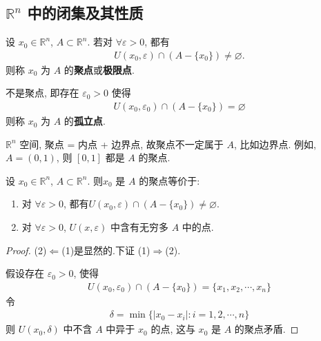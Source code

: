 \documentclass[../../main.tex]{subfiles}
\begin{document}
\subsection{$\mathbb{R}^n$ 中的闭集及其性质}

\begin{definition}[聚点、极限点和孤立点]
设 $x_0 \in \mathbb{R}^n$, $A \subset \mathbb{R}^n$. 若对 $\forall \varepsilon > 0$, 都有
\begin{align*}
U(x_0, \varepsilon) \cap (A - \{x_0\}) \neq \varnothing.
\end{align*}
则称 $x_0$ 为 $A$ 的\textbf{聚点}或\textbf{极限点}. 

不是聚点, 即存在 $\varepsilon_0 > 0$ 使得
\begin{align*}
U(x_0, \varepsilon_0) \cap (A - \{x_0\}) = \varnothing
\end{align*}
则称 $x_0$ 为 $A$ 的\textbf{孤立点}.
\end{definition}
\begin{remark}
$\mathbb{R}^n$ 空间, 聚点 = 内点 + 边界点, 故聚点不一定属于 $A$, 比如边界点. 例如, $A = (0, 1)$, 则 $[0, 1]$ 都是 $A$ 的聚点.
\end{remark}

\begin{proposition}[Rn中聚点的等价条件]\label{proposition:Rn中聚点的等价条件}
设 $x_0 \in \mathbb{R}^n$, $A \subset \mathbb{R}^n$. 则$x_0$ 是 $A$ 的聚点等价于:
\begin{enumerate}[(1)]
\item 对 $\forall \varepsilon > 0$, 都有$U(x_0, \varepsilon) \cap (A - \{x_0\}) \neq \varnothing.$

\item 对 $\forall \varepsilon > 0$, $U(x, \varepsilon)$ 中含有无穷多 $A$ 中的点.
\end{enumerate}
\end{proposition}
\begin{proof}
(2)$\Leftarrow$(1)是显然的.下证
(1)$\Rightarrow$(2).

假设存在 $\varepsilon_0 > 0$, 使得
\begin{align*}
U(x_0, \varepsilon_0) \cap (A - \{x_0\}) = \{x_1, x_2, \cdots, x_n\}
\end{align*}
令
\begin{align*}
\delta = \min\{|x_0 - x_i| : i = 1, 2, \cdots, n\}
\end{align*}
则 $U(x_0, \delta)$ 中不含 $A$ 中异于 $x_0$ 的点, 这与 $x_0$ 是 $A$ 的聚点矛盾.
\end{proof}
\end{document}
